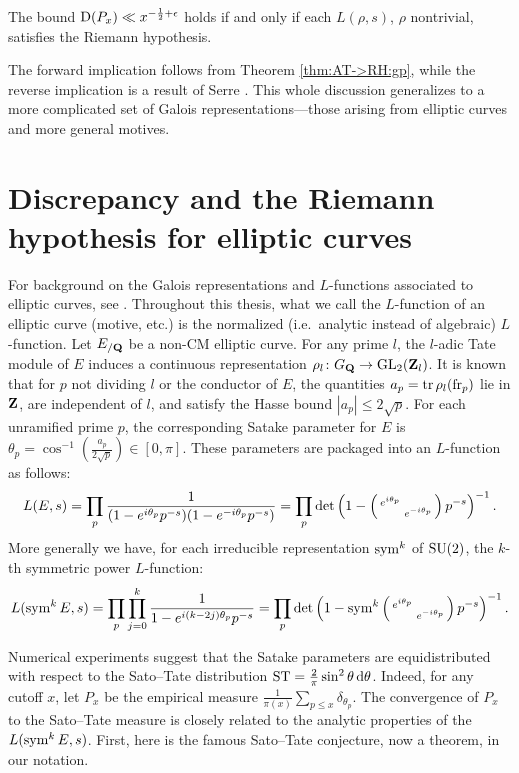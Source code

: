 \begin{theorem}
The bound $\operatorname{D}(P_x) \ll x^{-\frac 1 2+\epsilon}$ holds if and only if each
$L(\rho,s)$, $\rho$ nontrivial, satisfies the Riemann hypothesis. 
\end{theorem}

The forward implication follows from Theorem \ref{thm:AT->RH:gp}, while the reverse implication is a result of Serre \cite[Th.~4]{serre-1981}. 
This whole discussion generalizes to a more complicated set of Galois 
representations---those arising from elliptic curves and more general motives.  





\section{Discrepancy and the Riemann hypothesis for elliptic curves}

For background on the Galois representations and $L$-functions associated to 
elliptic curves, see \cite[III\S7, C\S17]{silverman-2009}. Throughout this 
thesis, what we call the $L$-function of an elliptic curve (motive, etc.) is 
the normalized (i.e.~analytic instead of algebraic) $L$-function. 
Let $E_{/\mathbf{Q}}$ be a non-CM elliptic curve. For any prime $l$, the $l$-adic Tate 
module of $E$ induces a continuous representation 
$\rho_l \colon G_{\mathbf{Q}} \to \operatorname{GL}_2(\mathbf{Z}_l)$. It is known that for $p$ not dividing 
$l$ or the conductor of $E$, the quantities 
$a_p = \operatorname{tr} \rho_l(\mathrm{fr}_p)$ lie in $\mathbf{Z}$, are independent of $l$, and satisfy 
the Hasse bound $|a_p| \leqslant 2\sqrt p$. For each unramified prime $p$, the 
corresponding Satake parameter for $E$ is 
$\theta_p = \cos^{-1}\left(\frac{a_p}{2\sqrt p}\right) \in [0,\pi]$. 
These parameters are packaged into an $L$-function as follows:
\[
	L(E,s) = \prod_p \frac{1}{(1 - e^{i \theta_p} p^{-s})(1- e^{-i \theta_p} p^{-s})} = \prod_p \det\left(1 - \left(\begin{smallmatrix} e^{i\theta_p} &  \\  & e^{-i \theta_p} \end{smallmatrix}\right)p^{-s}\right)^{-1}.
\]
More generally we have, for each irreducible representation $\operatorname{sym}^k$ of 
$\operatorname{SU}(2)$, the $k$-th symmetric power $L$-function: 
\[
	L(\operatorname{sym}^k E, s) = \prod_p \prod_{j=0}^k \frac{1}{1 - e^{i (k - 2j) \theta_p} p^{-s}} = \prod_p \det\left(1-\operatorname{sym}^k \left(\begin{smallmatrix} e^{i\theta_p} &  \\  & e^{-i \theta_p} \end{smallmatrix}\right)p^{-s}\right)^{-1}.
\]

Numerical experiments suggest that the Satake parameters are equidistributed 
with respect to the Sato--Tate distribution 
$\mathrm{ST} = \frac{2}{\pi} \sin^2\theta\, \mathrm{d}\theta$. Indeed, for any cutoff $x$, let 
$P_x$ be the empirical measure 
$\frac{1}{\pi(x)} \sum_{p\leqslant x} \delta_{\theta_p}$. 
The convergence of $P_x$ to the Sato--Tate measure is closely related to 
the analytic properties of the $L(\operatorname{sym}^k E,s)$. First, here is the famous 
Sato--Tate conjecture, now a theorem, in our notation. 

